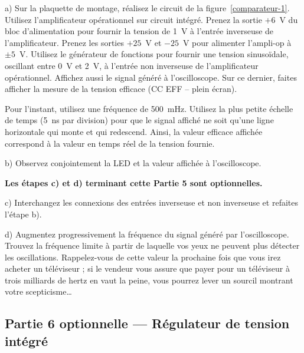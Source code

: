 \documentclass[canadien,12pt,oneside,letterpaper]{article}
\begin{document}
a) Sur la plaquette de montage, réalisez le circuit de la figure~\ref{comparateur-1}. Utilisez l'amplificateur opérationnel sur circuit intégré. Prenez la sortie $+6$~V du bloc d'alimentation pour fournir la tension de 1~V à l'entrée inverseuse de l'amplificateur. Prenez les sorties $+25$~V et $-25$~V pour alimenter l'ampli-op à $\pm5$~V. Utilisez le générateur de fonctions pour fournir une tension sinusoïdale, oscillant entre 0~V et 2~V, à l'entrée non inverseuse de l'amplificateur opérationnel. Affichez aussi le signal généré à l'oscilloscope. Sur ce dernier, faites afficher la mesure de la tension efficace (CC EFF -- plein écran).

Pour l'instant, utilisez une fréquence de 500~mHz. Utilisez la plus petite échelle de temps (5~ns par division) pour que le signal affiché ne soit qu'une ligne horizontale qui monte et qui redescend. Ainsi, la valeur efficace affichée correspond à la valeur en temps réel de la tension fournie.

b) Observez conjointement la LED et la valeur affichée à l'oscilloscope.

\begin{center}
    \large \textbf{Les étapes c) et d) terminant cette Partie 5 sont optionnelles.}
\end{center}

c) Interchangez les connexions des entrées inverseuse et non inverseuse et refaites l'étape b).

d) Augmentez progressivement la fréquence du signal généré par l'oscilloscope. Trouvez la fréquence limite à partir de laquelle vos yeux ne peuvent plus détecter les oscillations. Rappelez-vous de cette valeur la prochaine fois que vous irez acheter un téléviseur ; si le vendeur vous assure que payer pour un téléviseur à trois milliards de hertz en vaut la peine, vous pourrez lever un sourcil montrant votre scepticisme\ldots


\subsection{Partie 6 optionnelle --- Régulateur de tension intégré}
\end{document}
